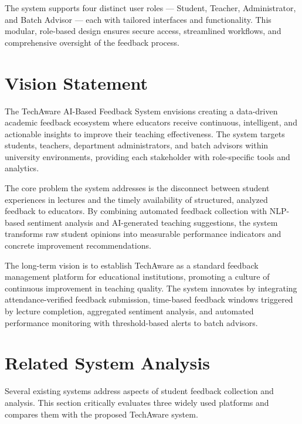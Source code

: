 The system supports four distinct user roles — Student, Teacher, Administrator, and Batch Advisor — each with tailored interfaces and functionality. This modular, role-based design ensures secure access, streamlined workflows, and comprehensive oversight of the feedback process.




\section{Vision Statement}

The TechAware AI-Based Feedback System envisions creating a data-driven academic feedback ecosystem where educators receive continuous, intelligent, and actionable insights to improve their teaching effectiveness. The system targets students, teachers, department administrators, and batch advisors within university environments, providing each stakeholder with role-specific tools and analytics.

The core problem the system addresses is the disconnect between student experiences in lectures and the timely availability of structured, analyzed feedback to educators. By combining automated feedback collection with NLP-based sentiment analysis and AI-generated teaching suggestions, the system transforms raw student opinions into measurable performance indicators and concrete improvement recommendations.

The long-term vision is to establish TechAware as a standard feedback management platform for educational institutions, promoting a culture of continuous improvement in teaching quality. The system innovates by integrating attendance-verified feedback submission, time-based feedback windows triggered by lecture completion, aggregated sentiment analysis, and automated performance monitoring with threshold-based alerts to batch advisors.




\section{Related System Analysis}

Several existing systems address aspects of student feedback collection and analysis. This section critically evaluates three widely used platforms and compares them with the proposed TechAware system.

